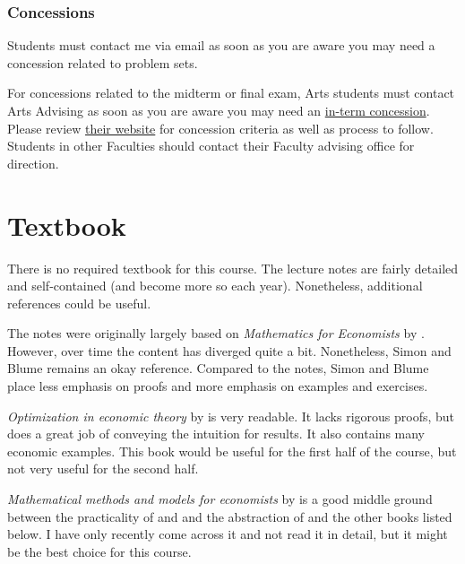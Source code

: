 \documentclass[10pt]{article}
\renewcommand{\cite}{\citet}
\begin{document}
\subsubsection{Concessions}

Students must contact me via email as soon as you are aware you may
need a concession related to problem sets.

For concessions related to the midterm or final exam, Arts students
must contact Arts Advising as soon as you are aware you may need an
\href{http://www.calendar.ubc.ca/vancouver/index.cfm?tree=3,329,0,0#26592}{in-term
  concession}. Please review
\href{https://students.arts.ubc.ca/advising/academic-performance/help-academic-concession/}{their
  website} for concession criteria as well as process to
follow. Students in other Faculties should contact their Faculty
advising office for direction.

\section{Textbook}

There is no required textbook for this course. The lecture notes are
fairly detailed and self-contained (and become more so each
year). Nonetheless, additional references could be useful.

The notes were originally largely based on \textit{Mathematics for
  Economists} by \cite{sb1994}. However, over time the content has
diverged quite a bit. Nonetheless, Simon and Blume remains an okay
reference. Compared to the notes, Simon and Blume place less emphasis
on proofs and more emphasis on examples and exercises.

\textit{Optimization in economic theory} by \cite{dixit1990} is very
readable. It lacks rigorous proofs, but does a great job of conveying
the intuition for results. It also contains many economic
examples. This book would be useful for the first half of the course,
but not very useful for the second half.

\textit{Mathematical methods and models for economists} by
\cite{fuente2000} is a good middle ground between the practicality of
\cite{dixit1990} and \cite{sb1994} and the abstraction of
\cite{carter2001} and the other books listed below. I have only
recently come across it and not read it in detail, but it might be the
best choice for this course.
\end{document}
